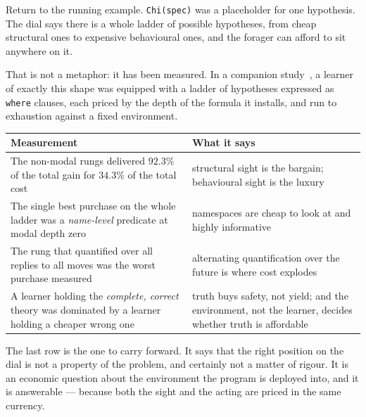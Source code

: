 Return to the running example. \texttt{Chi(spec)} was a placeholder for one
hypothesis. The dial says there is a whole ladder of possible hypotheses, from
cheap structural ones to expensive behavioural ones, and the forager can afford
to sit anywhere on it.

That is not a metaphor: it has been measured. In a companion
study~\cite{GameNote}, a learner of
exactly this shape was equipped with a ladder of hypotheses expressed as
\texttt{where} clauses, each priced by the depth of the formula it installs, and
run to exhaustion against a fixed environment.

\begin{center}
\small
\begin{tabular}{@{}L{0.52\textwidth}L{0.40\textwidth}@{}}
\toprule
\textbf{Measurement} & \textbf{What it says} \\
\midrule
The non-modal rungs delivered $92.3\%$ of the total gain for $34.3\%$ of the
total cost &
structural sight is the bargain; behavioural sight is the luxury \\[3pt]
The single best purchase on the whole ladder was a \emph{name-level} predicate
at modal depth zero &
namespaces are cheap to look at and highly informative \\[3pt]
The rung that quantified over all replies to all moves was the worst purchase
measured &
alternating quantification over the future is where cost explodes \\[3pt]
A learner holding the \emph{complete, correct} theory was dominated by a
learner holding a cheaper wrong one &
truth buys safety, not yield; and the environment, not the learner, decides
whether truth is affordable \\
\bottomrule
\end{tabular}
\end{center}

The last row is the one to carry forward. It says that the right position on the
dial is not a property of the problem, and certainly not a matter of rigour. It
is an economic question about the environment the program is deployed into, and
it is answerable --- because both the sight and the acting are priced in the same
currency.
